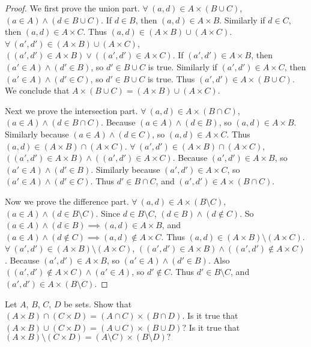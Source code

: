 \begin{proof}
We first prove the union part.
\(\forall\ (a, d) \in A \times (B \cup C)\), \((a \in A) \land (d \in B \cup C)\).
If \(d \in B\), then \((a, d) \in A \times B\).
Similarly if \(d \in C\), then \((a, d) \in A \times C\).
Thus \((a, d) \in (A \times B) \cup (A \times C)\).
\(\forall\ (a', d') \in (A \times B) \cup (A \times C)\), \(((a', d') \in A \times B) \lor ((a', d') \in A \times C)\).
If \((a', d') \in A \times B\), then \((a' \in A) \land (d' \in B)\), so \(d' \in B \cup C\) is true.
Similarly if \((a', d') \in A \times C\), then \((a' \in A) \land (d' \in C)\), so \(d' \in B \cup C\) is true.
Thus \((a', d') \in A \times (B \cup C)\).
We conclude that \(A \times (B \cup C) = (A \times B) \cup (A \times C)\).

Next we prove the intersection part.
\(\forall\ (a, d) \in A \times (B \cap C)\), \((a \in A) \land (d \in B \cap C)\).
Because \((a \in A) \land (d \in B)\), so \((a, d) \in A \times B\).
Similarly because \((a \in A) \land (d \in C)\), so \((a, d) \in A \times C\).
Thus \((a, d) \in (A \times B) \cap (A \times C)\).
\(\forall\ (a', d') \in (A \times B) \cap (A \times C)\), \(((a', d') \in A \times B) \land ((a', d') \in A \times C)\).
Because \((a', d') \in A \times B\), so \((a' \in A) \land (d' \in B)\).
Similarly because \((a', d') \in A \times C\), so \((a' \in A) \land (d' \in C)\).
Thus \(d' \in B \cap C\), and \((a', d') \in A \times (B \cap C)\).

Now we prove the difference part.
\(\forall\ (a, d) \in A \times (B \setminus C)\), \((a \in A) \land (d \in B \setminus C)\).
Since \(d \in B \setminus C\), \((d \in B) \land (d \notin C)\).
So \((a \in A) \land (d \in B) \implies (a, d) \in A \times B\), and \((a \in A) \land (d \notin C) \implies (a, d) \notin A \times C\).
Thus \((a, d) \in (A \times B) \setminus (A \times C)\).
\(\forall\ (a', d') \in (A \times B) \setminus (A \times C)\), \(((a', d') \in A \times B) \land ((a', d') \notin A \times C)\).
Because \((a', d') \in A \times B\), so \((a' \in A) \land (d' \in B)\).
Also \(((a', d') \notin A \times C) \land (a' \in A)\), so \(d' \notin C\).
Thus \(d' \in B \setminus C\), and \((a', d') \in A \times (B \setminus C)\).
\end{proof}

\begin{exercise}\label{exercise 3.5.5}
Let \(A\), \(B\), \(C\), \(D\) be sets.
Show that \((A \times B) \cap (C \times D) = (A \cap C) \times (B \cap D)\).
Is it true that \((A \times B) \cup (C \times D) = (A \cup C) \times (B \cup D)?\)
Is it true that \((A \times B) \setminus (C \times D) = (A \setminus C) \times (B \setminus D)?\)
\end{exercise}

